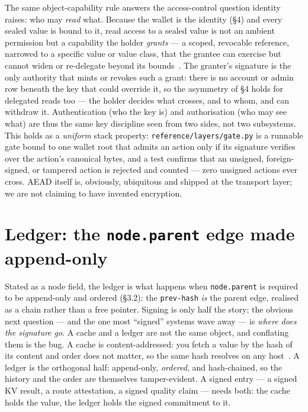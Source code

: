 \documentclass[11pt]{article}
\begin{document}
The same object-capability rule answers the access-control question identity raises:
who may \emph{read} what. Because the wallet is the identity (\S4) and every sealed
value is bound to it, read access to a sealed value is not an ambient permission but
a capability the holder \emph{grants} --- a scoped, revocable reference, narrowed to a
specific value or value class, that the grantee can exercise but cannot widen or
re-delegate beyond its bounds~\cite{ocap}. The granter's signature is the only
authority that mints or revokes such a grant: there is no account or admin row beneath
the key that could override it, so the asymmetry of \S4 holds for delegated reads too
--- the holder decides what crosses, and to whom, and can withdraw it. Authentication
(who the key is) and authorisation (who may see what) are thus the same key discipline
seen from two sides, not two subsystems. This holds as a
\emph{uniform} stack property: \texttt{reference/layers/gate.py} is a runnable gate
bound to one wallet root that admits an action only if its signature verifies over
the action's canonical bytes, and a test confirms that an unsigned, foreign-signed,
or tampered action is rejected and counted --- zero unsigned actions ever cross.
AEAD itself is, obviously, ubiquitous and shipped at the transport layer; we are not
claiming to have invented encryption.

\section{Ledger: the \texttt{node.parent} edge made append-only}

Stated as a node field, the ledger is what happens when \texttt{node.parent} is
required to be append-only and ordered (\S3.2): the \texttt{prev-hash} \emph{is} the
parent edge, realised as a chain rather than a free pointer. Signing is only half the
story; the obvious next question --- and the one most ``signed'' systems wave away ---
is \emph{where does the signature go}. A cache and
a ledger are not the same object, and conflating them is the bug. A cache is
content-addressed: you fetch a value by the hash of its content and order does not
matter, so the same hash resolves on any host~\cite{merkle}. A ledger is the
orthogonal half: append-only, \emph{ordered}, and hash-chained, so the history and
the order are themselves tamper-evident. A signed entry --- a signed KV result, a
route attestation, a signed quality claim --- needs both: the cache holds the
value, the ledger holds the signed commitment to it.
\end{document}
